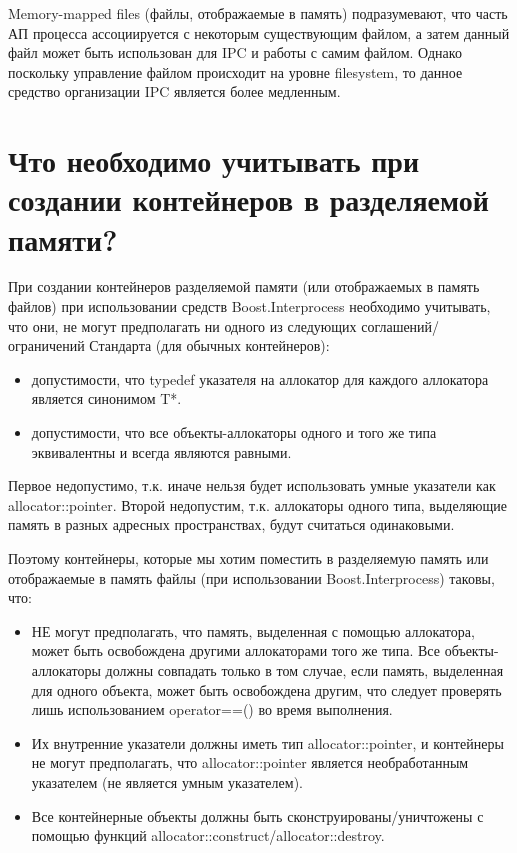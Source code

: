 \documentclass[a4paper,12pt]{article}	%
\begin{document}
	Memory-mapped files (файлы, отображаемые в память) подразумевают, что часть АП процесса ассоциируется с некоторым существующим файлом, а затем данный файл может быть использован для IPC и работы с самим файлом. Однако поскольку управление файлом происходит на уровне filesystem, то данное средство организации IPC является более медленным.
	
\section{Что необходимо учитывать при создании контейнеров в разделяемой памяти?}

	При создании контейнеров разделяемой памяти (или отображаемых в память файлов) при использовании средств Boost.Interprocess необходимо учитывать, что они, не могут предполагать ни одного из следующих соглашений/ограничений Стандарта (для обычных контейнеров):
	
	\begin{itemize}
	
		\item допустимости, что typedef указателя на аллокатор для каждого аллокатора является синонимом T*.

		\item допустимости, что все объекты-аллокаторы одного и того же типа эквивалентны и всегда являются равными.
		
	\end{itemize}		
	
	Первое недопустимо, т.к. иначе нельзя будет использовать умные указатели как allocator::pointer. Второй недопустим, т.к. аллокаторы одного типа, выделяющие память в разных адресных пространствах, будут считаться одинаковыми.
	
	Поэтому контейнеры, которые мы хотим поместить в разделяемую память или отображаемые в память файлы (при использовании Boost.Interprocess) таковы, что:
	
	\begin{itemize}
	
		\item НЕ могут предполагать, что память, выделенная с помощью аллокатора, может быть освобождена другими аллокаторами того же типа. Все объекты-аллокаторы должны совпадать только в том случае, если память, выделенная для одного объекта, может быть освобождена другим, что следует проверять лишь использованием operator==() во время выполнения.
		
		\item Их внутренние указатели должны иметь тип allocator::pointer, и контейнеры не могут предполагать, что allocator::pointer является необработанным указателем (не является умным указателем).
		
		\item Все контейнерные объекты должны быть сконструированы/уничтожены с помощью функций allocator::construct/allocator::destroy.
	
	\end{itemize}
	
\end{document}
